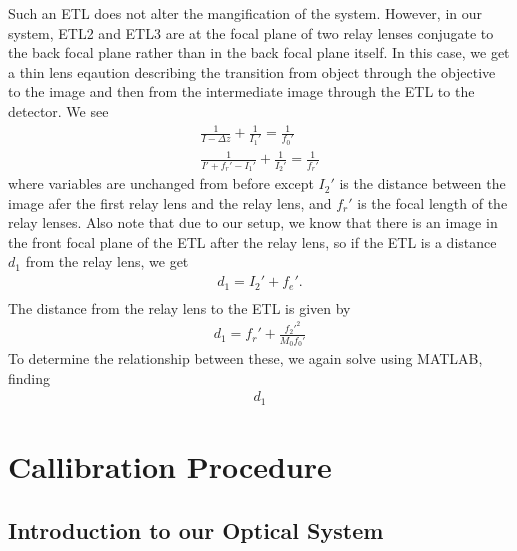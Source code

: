 Such an ETL does not alter the mangification of the system. However, in our system, ETL2 and ETL3 are at the focal plane of two relay lenses conjugate to the back focal plane rather than in the back focal plane itself. In this case, we get a thin lens eqaution describing the transition from object through the objective to the image and then from the intermediate image through the ETL to the detector. We see
\begin{gather}
	\frac{1}{I-\Delta z}+\frac 1{I_1'} = \frac 1{f_0'}\\
	\frac{1}{I' + f_r' - I_1'}+\frac1{I_2'} = \frac{1}{f_r'}
\end{gather}
 where variables are unchanged from before except $I_2'$ is the distance between the image afer the first relay lens and the relay lens, and $f_r'$ is the focal length of the relay lenses. Also note that due to our setup, we know that there is an image in the front focal plane of the ETL after the relay lens, so if the ETL is a distance $d_1$ from the relay lens, we get
\begin{gather}
	d_1 = I_2' + f_e'.\\
\end{gather}
The distance from the relay lens to the ETL is given by 
\begin{gather}
	d_1 = f_r' + \frac{f_2'^2}{M_0f_0'}
\end{gather}
To determine the relationship between these, we again solve using MATLAB, finding
\begin{gather}
	d_1
\end{gather}
\newpage

\section{Callibration Procedure}


\subsection{Introduction to our Optical System}

